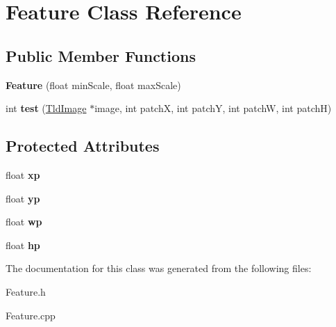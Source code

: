 \hypertarget{class_feature}{\section{\-Feature \-Class \-Reference}
\label{class_feature}
}
\subsection*{\-Public \-Member \-Functions}
\begin{DoxyCompactItemize}
\item 
\hypertarget{class_feature_acef335e8c404b1584c8f3160821d3b81}{{\bfseries \-Feature} (float min\-Scale, float max\-Scale)}\label{class_feature_acef335e8c404b1584c8f3160821d3b81}

\item 
\hypertarget{class_feature_a78c0317d3131e415e2512bcdb7368588}{int {\bfseries test} (\hyperlink{class_tld_image}{\-Tld\-Image} $\ast$image, int patch\-X, int patch\-Y, int patch\-W, int patch\-H)}\label{class_feature_a78c0317d3131e415e2512bcdb7368588}

\end{DoxyCompactItemize}
\subsection*{\-Protected \-Attributes}
\begin{DoxyCompactItemize}
\item 
\hypertarget{class_feature_a2071c0c6888fc77eb5079a93cf8e2128}{float {\bfseries xp}}\label{class_feature_a2071c0c6888fc77eb5079a93cf8e2128}

\item 
\hypertarget{class_feature_a197671260327be4626a073f24f3d2069}{float {\bfseries yp}}\label{class_feature_a197671260327be4626a073f24f3d2069}

\item 
\hypertarget{class_feature_a8d059015f895507cab8080803cb2f6e8}{float {\bfseries wp}}\label{class_feature_a8d059015f895507cab8080803cb2f6e8}

\item 
\hypertarget{class_feature_aa993543883d14a5b62c01d63387acfee}{float {\bfseries hp}}\label{class_feature_aa993543883d14a5b62c01d63387acfee}

\end{DoxyCompactItemize}


\-The documentation for this class was generated from the following files\-:\begin{DoxyCompactItemize}
\item 
\-Feature.\-h\item 
\-Feature.\-cpp\end{DoxyCompactItemize}
